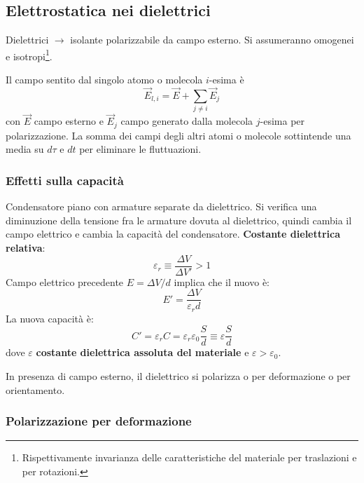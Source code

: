 \documentclass[a4paper]{scrartcl}
\numberwithin{equation}{subsection}
\theoremstyle{style1}
\begin{document}
\subsection{Elettrostatica nei dielettrici}
Dielettrici $\to$ isolante polarizzabile da campo esterno. Si assumeranno omogenei e isotropi\footnote{Rispettivamente invarianza delle caratteristiche del materiale per traslazioni e per rotazioni.}.

Il campo sentito dal singolo atomo o molecola $i$-esima \`e
\begin{equation}
	\vec{E}_{l,i} = \vec{E}+\sum_{j\neq i}^{} \vec{E}_j
\end{equation}
con $\vec{E}$ campo esterno e $\vec{E}_j$ campo generato dalla molecola $j$-esima per polarizzazione. La somma dei campi degli altri atomi o molecole sottintende una media su $d\tau $ e $dt$ per eliminare le fluttuazioni.
\subsubsection{Effetti sulla capacit\`a}
Condensatore piano con armature separate da dielettrico. Si verifica una diminuzione della tensione fra le armature dovuta al dielettrico, quindi cambia il campo elettrico e cambia la capacit\`a del condensatore. \textbf{Costante dielettrica relativa}:
\begin{equation}
	\varepsilon _r \equiv \frac{\Delta V}{\Delta V'} >1
\end{equation}
Campo elettrico precedente $E=\Delta V / d$ implica che il nuovo \`e:
\begin{equation}
	E' = \frac{\Delta V}{\varepsilon _r d}
\end{equation}
La nuova capacit\`a \`e:
\begin{equation}
	C' = \varepsilon _r C = \varepsilon _r \varepsilon _0 \frac{S}{d} \equiv \varepsilon  \frac{S}{d}
\end{equation}
dove $\varepsilon $ \textbf{costante dielettrica assoluta del materiale} e $\varepsilon >\varepsilon _0$. 

In presenza di campo esterno, il dielettrico si polarizza o per deformazione o per orientamento.
\subsubsection{Polarizzazione per deformazione}
\end{document}
